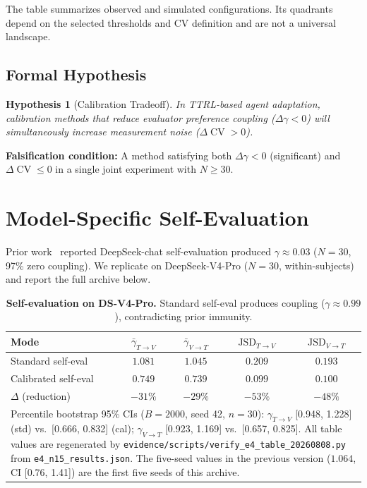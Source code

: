 \documentclass[11pt]{article}
\DeclareMathOperator{\CV}{CV}
\newtheorem{hypothesis}{Hypothesis}
\begin{document}
The table summarizes observed and simulated configurations. Its quadrants depend on the selected thresholds and CV definition and are not a universal landscape.

\subsection{Formal Hypothesis}

\begin{hypothesis}[Calibration Tradeoff]
In TTRL-based agent adaptation, calibration methods that reduce evaluator preference coupling ($\Delta\gamma < 0$) will simultaneously increase measurement noise ($\Delta\CV > 0$).
\end{hypothesis}

\textbf{Falsification condition:} A method satisfying both $\Delta\gamma < 0$ (significant) and $\Delta\CV \leq 0$ in a single joint experiment with $N \geq 30$.


\section{Model-Specific Self-Evaluation}

Prior work~\citep{liu2026epc} reported DeepSeek-chat self-evaluation produced $\gamma \approx 0.03$ ($N{=}30$, 97\% zero coupling). We replicate on DeepSeek-V4-Pro ($N{=}30$, within-subjects) and report the full archive below.

\begin{table}[H]
\centering
\caption{\textbf{Self-evaluation on DS-V4-Pro.} Standard self-eval produces coupling ($\gamma \approx 0.99$), contradicting prior immunity.}
\begin{tabular}{@{}lcccc@{}}
\toprule
Mode & $\bar{\gamma}_{T \to V}$ & $\bar{\gamma}_{V \to T}$ & $\text{JSD}_{T \to V}$ & $\text{JSD}_{V \to T}$ \\
\midrule
Standard self-eval & $1.081$ & $1.045$ & $0.209$ & $0.193$ \\
Calibrated self-eval & $\mathbf{0.749}$ & $\mathbf{0.739}$ & $\mathbf{0.099}$ & $\mathbf{0.100}$ \\
\midrule
$\Delta$ (reduction) & $-31\%$ & $-29\%$ & $-53\%$ & $-48\%$ \\
\bottomrule
\multicolumn{5}{l}{\footnotesize Percentile bootstrap 95\% CIs ($B{=}2000$, seed 42, $n{=}30$): $\gamma_{T\to V}$ [0.948, 1.228] (std) vs.\ [0.666, 0.832] (cal); $\gamma_{V\to T}$ [0.923, 1.169] vs.\ [0.657, 0.825]. All table values are regenerated by \texttt{evidence/scripts/verify\_e4\_table\_20260808.py} from \texttt{e4\_n15\_results.json}. The five-seed values in the previous version ($1.064$, CI [0.76, 1.41]) are the first five seeds of this archive.} \\
\end{tabular}
\end{table}
\end{document}

